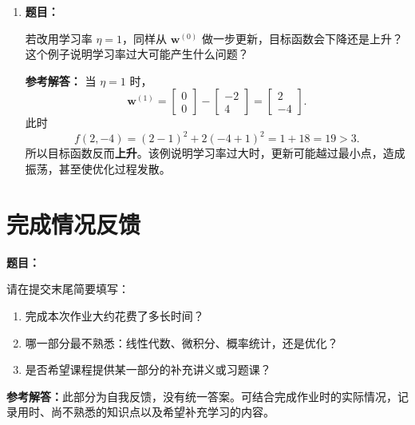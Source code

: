 \documentclass[11pt,a4paper]{article}
\newcommand{\ans}{\textcolor{answerblue}{\textbf{参考解答：}}}
\newenvironment{question}{%
  \par\begingroup\color{black!82}\noindent\textbf{题目：}\ignorespaces
}{%
  \par\endgroup\smallskip
}
\begin{document}
\begin{enumerate}
  \item
  \begin{question}
  若改用学习率 $\eta=1$，同样从 $\bm w^{(0)}$ 做一步更新，目标函数会下降还是上升？
  这个例子说明学习率过大可能产生什么问题？
  \end{question}
  \ans
  当 $\eta=1$ 时，
  \[
    \bm w^{(1)}
    =\begin{bmatrix}0\\0\end{bmatrix}
     -\begin{bmatrix}-2\\4\end{bmatrix}
    =\begin{bmatrix}2\\-4\end{bmatrix}.
  \]
  此时
  \[
    f(2,-4)=(2-1)^2+2(-4+1)^2=1+18=19>3.
  \]
  所以目标函数反而\textbf{上升}。该例说明学习率过大时，更新可能越过最小点，造成振荡，甚至使优化过程发散。
\end{enumerate}

\section*{完成情况反馈}

\begin{question}
请在提交末尾简要填写：
\begin{enumerate}[label=\arabic*.,leftmargin=2em]
  \item 完成本次作业大约花费了多长时间？
  \item 哪一部分最不熟悉：线性代数、微积分、概率统计，还是优化？
  \item 是否希望课程提供某一部分的补充讲义或习题课？
\end{enumerate}
\end{question}

\ans 此部分为自我反馈，没有统一答案。可结合完成作业时的实际情况，记录用时、尚不熟悉的知识点以及希望补充学习的内容。
\end{document}
